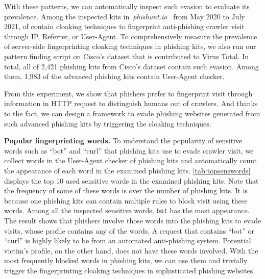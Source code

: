 With these patterns, we can automatically inspect such evasion to evaluate its prevalence.
Among the inspected kits in~\emph{phishunt.io}~\cite{phishunt} from May 2020 to July 2021, \fpphishingkit of \totalphishingkit contain cloaking techniques to fingerprint anti-phishing crawler visit through IP, Referrer, or User-Agent.
To comprehensively measure the prevalence of server-side fingerprinting cloaking techniques in phishing kits,
we also run our pattern finding script on Cisco's dataset that is contributed to Virus Total.
In total, all of 2,421 phishing kits from Cisco's dataset contain such evasion.
Among them, 1,983 of the advanced phishing kits contain User-Agent checker.

From this experiment,
we show that phishers prefer to fingerprint visit through information in HTTP request to distinguish humans out of crawlers.
And thanks to the fact, 
we can design a framework to evade phishing websites generated from such advanced phishing kits by triggering the cloaking techniques.



\noindent
\textbf{Popular fingerprinting words.}
To understand the popularity of sensitive words such as ``bot'' and ``curl'' that phishing kits use to evade crawler visit,
we collect \numsenswords words in the User-Agent checker of phishing kits and automatically count the appearance of each word in the examined phishing kits.
\autoref{tab:topsenswords} displays the top 10 used sensitive words in the examined phishing kits.
Note that the frequency of some of these words is over the number of phishing kits.
It is because one phishing kits can contain multiple rules to block visit using these words.
Among all the inspected sensitive words, \texttt{bot} has the most appearance.
The result shows that phishers involve those words into the phishing kits to evade visits, whose profile contains any of the words,
A request that contains ``bot'' or ``curl'' is highly likely to be from an automated anti-phishing system.
Potential victim's profile, on the other hand, does not have these words involved.
With the most frequently blocked words in phishing kits, we can use them and trivially trigger the fingerprinting cloaking techniques in sophisticated phishing websites.


\topsenswords